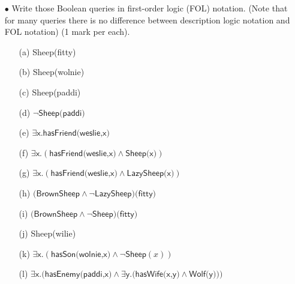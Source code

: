 \documentclass{article}
\begin{document}
\begin{itemize}
    \item[$\bullet$] Write those Boolean queries in first-order logic (FOL) notation. (Note that
for many queries there is no difference between description logic notation
and FOL notation) (1 mark per each).
\begin{itemize}
    \item[(a)] \textsf{Sheep(fitty)}
    \item[(b)] \textsf{Sheep(wolnie)}
    \item[(c)] \textsf{Sheep(paddi)}
    \item[(d)] $\neg\textsf{Sheep(paddi)}$
    \item[(e)] $\exists \textsf{x.hasFriend}\textsf{(weslie,x)}$
    \item[(f)] $\exists \textsf{x.}(\textsf{hasFriend}\textsf{(weslie,x)}\wedge\textsf{Sheep(x)})$
    \item[(g)] $\exists \textsf{x.}(\textsf{hasFriend}\textsf{(weslie,x)}\wedge\textsf{LazySheep(x)})$
    \item[(h)] $(\textsf{BrownSheep}\wedge\neg\textsf{LazySheep)(fitty)}$
    \item[(i)] $(\textsf{BrownSheep}\wedge\neg\textsf{Sheep)(fitty)}$
    \item[(j)] \textsf{Sheep(wilie)}
    \item[(k)] $\exists \textsf{x.}(\textsf{hasSon}\textsf{(wolnie,x)}\wedge\neg\textsf{Sheep}(x))$
    \item[(l)] $\exists\textsf{x.}(\textsf{hasEnemy(paddi,x)}\wedge\exists\textsf{y.}(
         \textsf{hasWife(x,y)}\wedge\textsf{Wolf(y)))}$
\end{itemize}


\end{itemize}
\end{document}
